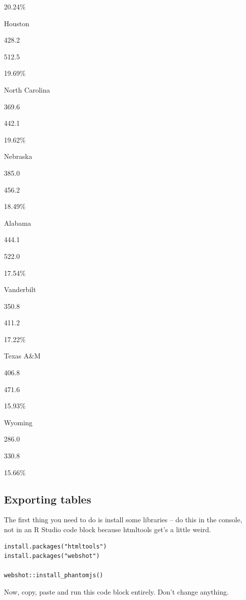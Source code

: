 \documentclass[]{book}
\begin{document}
20.24\%

Houston

{428.2}

{512.5}

19.69\%

North Carolina

{369.6}

{442.1}

19.62\%

Nebraska

{385.0}

{456.2}

18.49\%

Alabama

{444.1}

{522.0}

17.54\%

Vanderbilt

{350.8}

{411.2}

17.22\%

Texas A\&M

{406.8}

{471.6}

15.93\%

Wyoming

{286.0}

{330.8}

15.66\%

\subsection{Exporting tables}\label{exporting-tables}

The first thing you need to do is install some libraries -- do this in
the console, not in an R Studio code block because htmltools get's a
little weird.

\begin{verbatim}
install.packages("htmltools")
install.packages("webshot")

webshot::install_phantomjs()
\end{verbatim}

Now, copy, paste and run this code block entirely. Don't change
anything.
\end{document}
